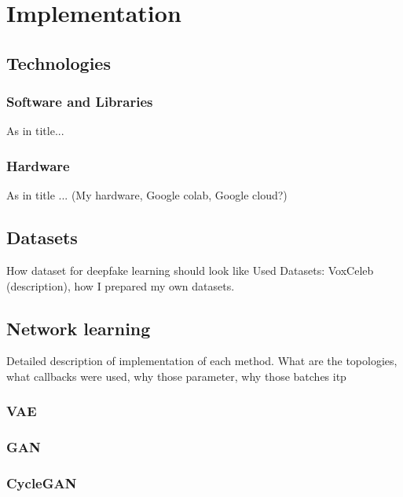 \chapter{Implementation}
\section{Technologies}
\subsection{Software and Libraries}
As in title...

\subsection{Hardware}
As in title ... (My hardware, Google colab, Google cloud?)

\section{Datasets}
How dataset for deepfake learning should look like
Used Datasets: VoxCeleb (description), how I prepared my own datasets.

\section{Network learning}
Detailed description of implementation of each method. What are the topologies, what callbacks were used, why those parameter, why those batches itp
\subsection{VAE}
\subsection{GAN}
\subsection{CycleGAN}